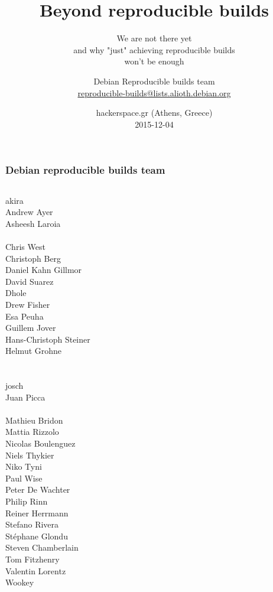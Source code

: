 \documentclass[14pt]{beamer}
\title[Beyond Reproducible builds]{Beyond reproducible builds}
\subtitle{We are not there yet \\
and why "just" achieving reproducible builds \\
won't be enough}
\author[h01ger]{%
   \texorpdfstring{
            \centering
            Debian Reproducible builds team\\
            \href{mailto:reproducible-builds@lists.alioth.debian.org}{reproducible-builds@lists.alioth.debian.org}
   }{h01ger}}
\institute[Debian]{}
\date[hackerspace.gr '15]{%
 hackerspace.gr (Athens, Greece)\\
 \small{2015-12-04}}
\begin{document}
\begin{frame}
 \titlepage
\end{frame}

\begin{frame}
 \frametitle{Debian reproducible builds team}
 \begin{center}
  \begin{columns}
   \small
    {akira} \\
    {Andrew Ayer} \\
    {Asheesh Laroia} \\
     \\
    {Chris West} \\
    {Christoph Berg} \\
    {Daniel Kahn Gillmor} \\
    David Suarez \\
    {Dhole} \\
    Drew Fisher \\
    Esa Peuha \\
    {Guillem Jover} \\
    Hans-Christoph Steiner \\
    {Helmut Grohne} \\
     \\
     \\
    {josch} \\
    Juan Picca \\
     \\
    Mathieu Bridon \\
    {Mattia Rizzolo} \\
    Nicolas Boulenguez \\
    {Niels Thykier} \\
    Niko Tyni \\
    {Paul Wise} \\
    Peter De Wachter \\
    Philip Rinn \\
    {Reiner Herrmann} \\
    {Stefano Rivera} \\
    {Stéphane Glondu} \\
    {Steven Chamberlain} \\
    Tom Fitzhenry \\
    Valentin Lorentz \\
    {Wookey} \\
     \\
  \end{columns}
 \end{center}
\end{frame}
\end{document}
